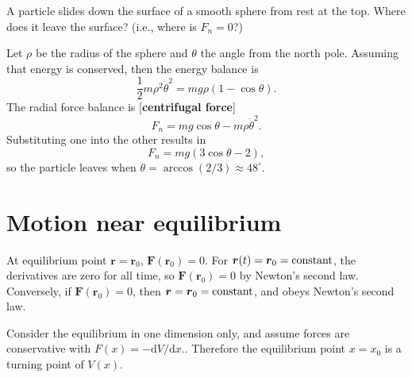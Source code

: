 \documentclass[letter-paper]{tufte-book}
\newenvironment{example}[1][Example]{\begin{trivlist}
\item[\hskip \labelsep {\bfseries #1}]}{\end{trivlist}}
\newcommand{\Fb}{\boldsymbol{F}}
\newcommand{\rb}{\boldsymbol{r}}
\newcommand\Def[1]{\textbf{#1}}
\begin{document}
\begin{example}
  A particle slides down the surface of a smooth sphere from rest at the top.
  Where does it leave the surface? (i.e., where is $F_n = 0$?)
  
  Let $\rho$ be the radius of the sphere and $\theta$ the angle from the north
  pole. Assuming that energy is conserved, then the energy balance is
  \begin{equation*}
    \frac{1}{2}m\rho^2\dot{\theta}^2 = mg\rho(1 - \cos\theta).
  \end{equation*}
  The radial force balance is [\Def{centrifugal force}]
  \begin{equation*}
    F_n = mg\cos\theta - m\rho\dot{\theta}^2.
  \end{equation*}
  Substituting one into the other results in
  \begin{equation*}
    F_n = mg(3\cos\theta - 2),
  \end{equation*}
  so the particle leaves when $\theta = \arccos(2/3)\approx 48^\circ$.
\end{example}


\section{Motion near equilibrium}

At equilibrium point $\rb = \rb_0$, $\Fb(\rb_0) = 0$. For $\rb(t) = \rb_0 =
\textnormal{constant}$, the derivatives are zero for all time, so $\Fb(\rb_0) =
0$ by Newton's second law. Conversely, if $\Fb(\rb_0) = 0$, then $\rb = \rb_0 =
\textnormal{constant}$, and obeys Newton's second law.

Consider the equilibrium in one dimension only, and assume forces are
conservative with $F(x) = -\mathrm{d}V/\mathrm{d}x$.. Therefore the equilibrium
point $x=x_0$ is a turning point of $V(x)$.
\end{document}

